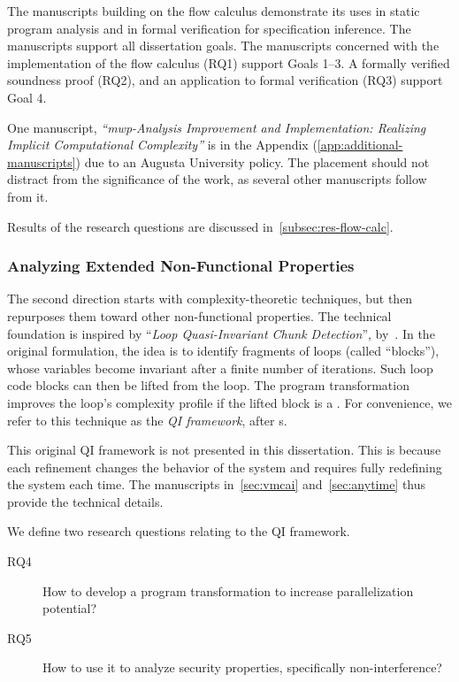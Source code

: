 The manuscripts building on the flow calculus demonstrate its uses in static
program analysis and in formal verification for specification inference. The
manuscripts support all dissertation goals. The manuscripts concerned with the
implementation of the flow calculus (RQ1) support Goals 1--3. A formally
verified soundness proof (RQ2), and an application to formal verification (RQ3)
support Goal 4.

One manuscript, \emph{\enquote{mwp-Analysis Improvement and Implementation:
Realizing Implicit Computational Complexity}} is in the Appendix
(\autoref{app:additional-manuscripts}) due to an Augusta University policy. The
placement should not distract from the significance of the work, as several
other manuscripts follow from it.

Results of the research questions are discussed
in~\autoref{subsec:res-flow-calc}.

\subsubsection{Analyzing Extended Non-Functional Properties}

The second direction starts with complexity-theoretic techniques, but then
repurposes them toward other non-functional properties. The technical foundation
is inspired by \enquote{\emph{Loop Quasi-Invariant Chunk Detection}},
by~\textcite{moyen20172}. In the original formulation, the idea is to identify
fragments of loops (called \enquote{blocks}), whose variables become invariant
after a finite number of iterations. Such loop  code blocks
can then be lifted from the loop. The program transformation improves the loop's
complexity profile if the lifted block is a . For convenience,
we refer to this technique as the \emph{QI framework}, after
s.

This original QI framework is not presented in this dissertation. This is
because each refinement changes the behavior of the system and requires fully
redefining the system each time. The manuscripts in~\autoref{sec:vmcai}
and~\autoref{sec:anytime} thus provide the technical details.

We define two research questions relating to the QI framework.

\begin{description}

\item[RQ4] How to develop a program transformation to increase parallelization
potential?

\item[RQ5] How to use it to analyze security properties, specifically
non-interference?

\end{description}


